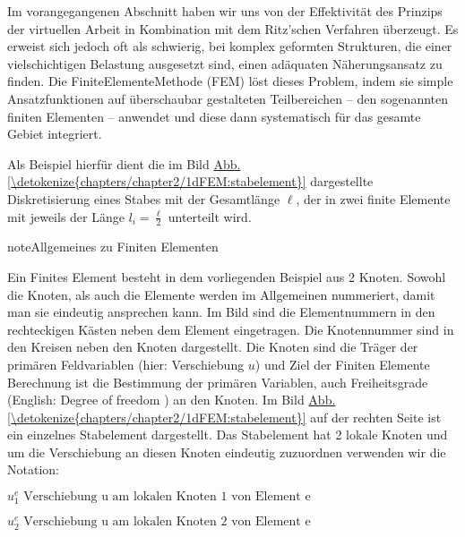 \documentclass[letterpaper,10pt,german]{jupyterBook}
\begin{document}
\sphinxAtStartPar
Im vorangegangenen Abschnitt haben wir uns von der Effektivität des Prinzips der virtuellen Arbeit in Kombination mit dem Ritz’schen Verfahren überzeugt. Es erweist sich jedoch oft als schwierig, bei komplex geformten Strukturen, die einer vielschichtigen Belastung ausgesetzt sind, einen adäquaten Näherungsansatz zu finden. Die Finite\sphinxhyphen{}Elemente\sphinxhyphen{}Methode (FEM) löst dieses Problem, indem sie simple Ansatzfunktionen auf überschaubar gestalteten Teilbereichen – den sogenannten finiten Elementen – anwendet und diese dann systematisch für das gesamte Gebiet integriert.

\sphinxAtStartPar
Als Beispiel hierfür dient die im Bild \hyperref[\detokenize{chapters/chapter2/1dFEM:stabelement}]{Abb.\@ \ref{\detokenize{chapters/chapter2/1dFEM:stabelement}}} dargestellte Diskretisierung eines Stabes mit der Gesamtlänge \(\ell\), der in zwei finite Elemente mit jeweils der Länge \(l_i = \frac{\ell}{2}\) unterteilt wird.

\begin{sphinxadmonition}{note}{Allgemeines zu Finiten Elementen}

\sphinxAtStartPar
Ein Finites Element besteht in dem vorliegenden Beispiel aus 2 Knoten. Sowohl die Knoten, als auch die Elemente werden im Allgemeinen nummeriert, damit man sie eindeutig ansprechen kann. Im Bild sind die Elementnummern in den rechteckigen Kästen neben dem Element eingetragen. Die Knotennummer sind in den Kreisen neben den Knoten dargestellt. Die Knoten sind die Träger der primären Feldvariablen (hier: Verschiebung \(u\)) und Ziel der Finiten Elemente Berechnung ist die Bestimmung der primären Variablen, auch Freiheitsgrade (English: Degree of freedom ) an den Knoten. Im Bild \hyperref[\detokenize{chapters/chapter2/1dFEM:stabelement}]{Abb.\@ \ref{\detokenize{chapters/chapter2/1dFEM:stabelement}}} auf der rechten Seite ist ein einzelnes Stabelement dargestellt. Das Stabelement hat 2 lokale Knoten und um die Verschiebung an diesen Knoten eindeutig zuzuordnen verwenden wir die Notation:

\sphinxAtStartPar
\(
u_1^{e} \text{ Verschiebung u am lokalen Knoten 1 von Element e}
\)

\sphinxAtStartPar
\(
u_2^{e} \text{ Verschiebung u am lokalen Knoten 2 von Element e}
\)
\end{sphinxadmonition}
\end{document}
